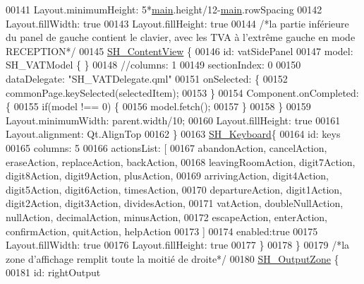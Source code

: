 \begin{DoxyCode}
00141             Layout.minimumHeight: 5*\hyperlink{main_8cpp_a3c04138a5bfe5d72780bb7e82a18e627}{main}.height/12-\hyperlink{main_8cpp_a3c04138a5bfe5d72780bb7e82a18e627}{main}.rowSpacing
00142             Layout.fillWidth: \textcolor{keyword}{true}
00143             Layout.fillHeight: \textcolor{keyword}{true}
00144             \textcolor{comment}{/*la partie inférieure du panel de gauche contient le clavier, avec les TVA à l'extrême gauche
       en mode RECEPTION*/}
00145             \hyperlink{classSH__ContentView}{SH\_ContentView} \{
00146                 \textcolor{keywordtype}{id}: vatSidePanel
00147                 model: SH\_VATModel \{ \}
00148                 \textcolor{comment}{//columns: 1}
00149                 sectionIndex: 0
00150                 dataDelegate: \textcolor{stringliteral}{"SH\_VATDelegate.qml"}
00151                 onSelected: \{
00152                     commonPage.keySelected(selectedItem);
00153                 \}
00154                 Component.onCompleted: \{
00155                     \textcolor{keywordflow}{if}(model !== 0) \{
00156                         model.fetch();
00157                     \}
00158                 \}
00159                 Layout.minimumWidth: parent.width/10;
00160                 Layout.fillHeight: \textcolor{keyword}{true}
00161                 Layout.alignment: Qt.AlignTop
00162             \}
00163             \hyperlink{classSH__Keyboard}{SH\_Keyboard}\{
00164                 \textcolor{keywordtype}{id}: keys
00165                 columns: 5
00166                 actionsList: [
00167                     abandonAction, cancelAction, eraseAction, replaceAction, backAction,
00168                     leavingRoomAction, digit7Action, digit8Action, digit9Action, plusAction,
00169                     arrivingAction, digit4Action, digit5Action, digit6Action, timesAction,
00170                     departureAction, digit1Action, digit2Action, digit3Action, dividesAction,
00171                     vatAction, doubleNullAction, nullAction, decimalAction, minusAction,
00172                     escapeAction, enterAction, confirmAction, quitAction, helpAction
00173                 ]
00174                 enabled:\textcolor{keyword}{true}
00175                 Layout.fillWidth: \textcolor{keyword}{true}
00176                 Layout.fillHeight: \textcolor{keyword}{true}
00177             \}
00178         \}
00179         \textcolor{comment}{/*la zone d'affichage remplit toute la moitié de droite*/}
00180         \hyperlink{classSH__OutputZone}{SH\_OutputZone} \{
00181             \textcolor{keywordtype}{id}: rightOutput

\end{DoxyCode}
